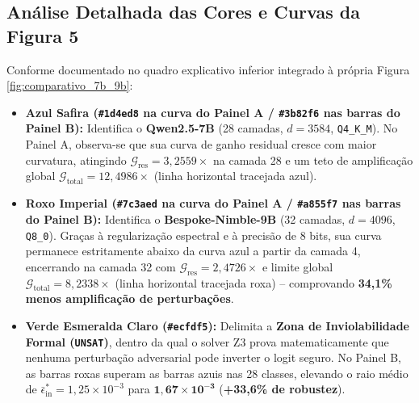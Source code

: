 \documentclass[11pt,a4paper]{article}
\theoremstyle{definition}
\begin{document}
\subsection{Análise Detalhada das Cores e Curvas da Figura 5}

Conforme documentado no quadro explicativo inferior integrado à própria Figura \ref{fig:comparativo_7b_9b}:
\begin{itemize}
    \item \textbf{Azul Safira (\texttt{\#1d4ed8} na curva do Painel A / \texttt{\#3b82f6} nas barras do Painel B):} Identifica o \textbf{Qwen2.5-7B} (28 camadas, $d=3584$, \texttt{Q4\_K\_M}). No Painel A, observa-se que sua curva de ganho residual cresce com maior curvatura, atingindo $\mathcal{G}_{\text{res}} = 3{,}2559\times$ na camada 28 e um teto de amplificação global $\mathcal{G}_{\text{total}} = 12{,}4986\times$ (linha horizontal tracejada azul).
    \item \textbf{Roxo Imperial (\texttt{\#7c3aed} na curva do Painel A / \texttt{\#a855f7} nas barras do Painel B):} Identifica o \textbf{Bespoke-Nimble-9B} (32 camadas, $d=4096$, \texttt{Q8\_0}). Graças à regularização espectral e à precisão de 8 bits, sua curva permanece estritamente abaixo da curva azul a partir da camada 4, encerrando na camada 32 com $\mathcal{G}_{\text{res}} = 2{,}4726\times$ e limite global $\mathcal{G}_{\text{total}} = 8{,}2338\times$ (linha horizontal tracejada roxa) -- comprovando \textbf{34,1\% menos amplificação de perturbações}.
    \item \textbf{Verde Esmeralda Claro (\texttt{\#ecfdf5}):} Delimita a \textbf{Zona de Inviolabilidade Formal (\texttt{UNSAT})}, dentro da qual o solver Z3 prova matematicamente que nenhuma perturbação adversarial pode inverter o logit seguro. No Painel B, as barras roxas superam as barras azuis nas 28 classes, elevando o raio médio de $\bar{\epsilon}_{\text{in}}^* = 1{,}25 \times 10^{-3}$ para $\mathbf{1{,}67 \times 10^{-3}}$ (\textbf{+33,6\% de robustez}).
\end{itemize}
\end{document}
